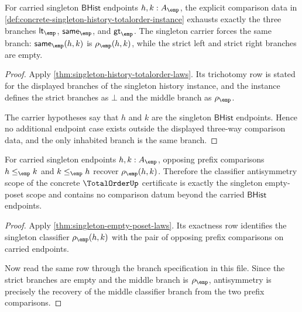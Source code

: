 \begin{theorem}
\label{thm:totalorder-carrier-branch-exhaustion}
For carried singleton $\mathsf{BHist}$ endpoints $h,k:A_{\emp}$, the explicit
comparison data in
\autoref{def:concrete-singleton-history-totalorder-instance} exhausts exactly
the three branches
$\mathsf{lt}_{\emp}$, $\mathsf{same}_{\emp}$, and
$\mathsf{gt}_{\emp}$. The singleton carrier forces the same branch:
$\mathsf{same}_{\emp}(h,k)$ is $\rho_{\emp}(h,k)$, while the strict left and
strict right branches are empty.
\end{theorem}
\begin{proof}
Apply \autoref{thm:singleton-history-totalorder-laws}. Its trichotomy row is
stated for the displayed branches of the singleton history instance, and the
instance defines the strict branches as $\bot$ and the middle branch as
$\rho_{\emp}$.

The carrier hypotheses say that $h$ and $k$ are the singleton $\mathsf{BHist}$
endpoints. Hence no additional endpoint case exists outside the displayed
three-way comparison data, and the only inhabited branch is the same branch.
\end{proof}

\begin{theorem}
\label{thm:totalorder-classifier-antisymmetry-scope}
For carried singleton endpoints $h,k:A_{\emp}$, opposing prefix comparisons
$h\le_{\emp}k$ and $k\le_{\emp}h$ recover $\rho_{\emp}(h,k)$. Therefore the
classifier antisymmetry scope of the concrete $\TotalOrderUp$ certificate is
exactly the singleton empty-poset scope and contains no comparison datum beyond
the carried $\mathsf{BHist}$ endpoints.
\end{theorem}
\begin{proof}
Apply \autoref{thm:singleton-empty-poset-laws}. Its exactness row identifies
the singleton classifier $\rho_{\emp}(h,k)$ with the pair of opposing prefix
comparisons on carried endpoints.

Now read the same row through the branch specification in this file. Since the
strict branches are empty and the middle branch is $\rho_{\emp}$, antisymmetry
is precisely the recovery of the middle classifier branch from the two prefix
comparisons.
\end{proof}

